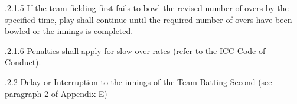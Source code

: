 \documentclass[12pt]{article}
\begin{document}
\vspace{\baselineskip}
\begin{adjustwidth}{1.97in}{0.1in}
\begin{justify}
{\fontsize{9pt}{10.8pt}.2.1.5 \tabto{1.96in} If the team fielding first fails to bowl the revised number of overs by the specified time, play shall continue until the required number of overs have been bowled or the innings is completed.\par}
\end{justify}\par

\end{adjustwidth}


\vspace{\baselineskip}
\begin{adjustwidth}{1.18in}{0.0in}
{\fontsize{9pt}{10.8pt}.2.1.6 \tabto{1.96in} Penalties shall apply for slow over rates (refer to the ICC Code of Conduct).\par}\par

\end{adjustwidth}


\vspace{\baselineskip}
\begin{adjustwidth}{1.18in}{0.14in}
{\fontsize{9pt}{10.8pt}.2.2 \tabto{1.17in} Delay or Interruption to the innings of the Team Batting Second (see paragraph 2 of Appendix E)\par}\par

\end{adjustwidth}


\vspace{\baselineskip}

\vspace{\baselineskip}

\vspace{\baselineskip}

\vspace{\baselineskip}

\vspace{\baselineskip}

\vspace{\baselineskip}

\vspace{\baselineskip}

\vspace{\baselineskip}

\vspace{\baselineskip}
\end{document}
